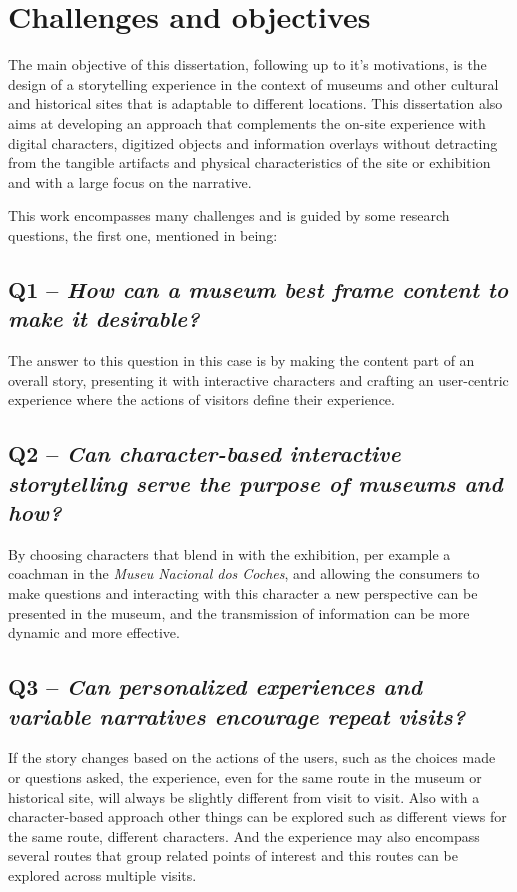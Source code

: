 \section{Challenges and objectives}
\label{sec:challenges_and_objectives}
The main objective of this dissertation, following up to it's motivations, is the design of a storytelling experience in the context of
museums and other cultural and historical sites that is adaptable to different locations. This dissertation also aims at developing an approach that
complements the on-site experience with digital characters, digitized objects and information overlays without detracting from the tangible
artifacts and physical characteristics of the site or exhibition and with a large focus on the narrative.

This work encompasses many challenges and is guided by some research questions, the first one, mentioned in \cite[p. 463]{wyman_digital_2011} being:

\subsection*{\textbf{Q1} -- \textit{How can a museum best frame content to make it desirable?}}

The answer to this question in this case is by making the content part of an overall story, presenting it with interactive characters and
crafting an user-centric experience where the actions of visitors define their experience.

\subsection*{\textbf{Q2} -- \textit{Can character-based interactive storytelling serve the purpose of museums and how?}}

By choosing characters that blend in with the exhibition, per example a coachman in the \textit{Museu Nacional dos Coches}, 
and allowing the consumers to make questions and interacting with this character a new perspective can be presented in the museum,
and the transmission of information can be more dynamic and more effective.

\subsection*{\textbf{Q3} -- \textit{Can personalized experiences and variable narratives encourage repeat visits?}}

If the story changes based on the actions of the users, such as the choices made or questions asked, the experience,
even for the same route in the museum or historical site, will always be slightly different from visit to visit. Also with a character-based approach
other things can be explored such as different views for the same route, different characters. And the experience may also encompass several routes that
group related points of interest and this routes can be explored across multiple visits.

